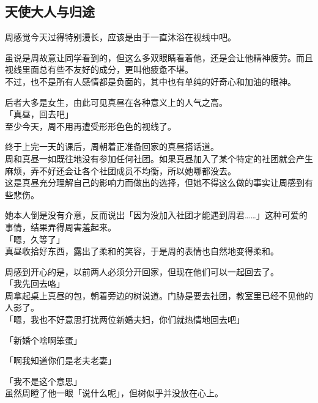 \subsection{天使大人与归途}

周感觉今天过得特别漫长，应该是由于一直沐浴在视线中吧。

虽说是周故意让同学看到的，但这么多双眼睛看着他，还是会让他精神疲劳。而且视线里面总有些不友好的成分，更叫他疲惫不堪。\\

不过，也不是所有人感情都是负面的，其中也有单纯的好奇心和加油的眼神。

后者大多是女生，由此可见真昼在各种意义上的人气之高。\\

「真昼，回去吧」\\

至少今天，周不用再遭受形形色色的视线了。

终于上完一天的课后，周朝着正准备回家的真昼搭话道。\\

周和真昼一如既往地没有参加任何社团。如果真昼加入了某个特定的社团就会产生麻烦，弄不好还会让各个社团成员不均衡，所以她哪都没去。\\

这是真昼充分理解自己的影响力而做出的选择，但她不得这么做的事实让周感到有些悲伤。

她本人倒是没有介意，反而说出「因为没加入社团才能遇到周君……」这种可爱的事情，结果弄得周害羞起来。\\

「嗯，久等了」\\

真昼收拾好东西，露出了柔和的笑容，于是周的表情也自然地变得柔和。

周感到开心的是，以前两人必须分开回家，但现在他们可以一起回去了。\\

「我先回去咯」\\

周拿起桌上真昼的包，朝着旁边的树说道。门胁是要去社团，教室里已经不见他的人影了。\\

「嗯，我也不好意思打扰两位新婚夫妇，你们就热情地回去吧」

「新婚个啥啊笨蛋」

「啊我知道你们是老夫老妻」

「我不是这个意思」\\

虽然周瞪了他一眼「说什么呢」，但树似乎并没放在心上。


